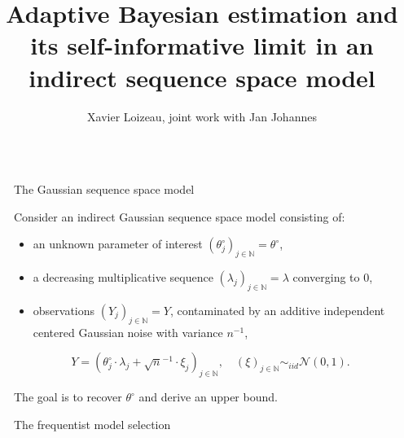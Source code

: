 \documentclass[final,hyperref={pdfpagelabels=false}]{beamer}
\title{\Huge Adaptive Bayesian estimation and its self-informative limit in an indirect sequence space model} %
\author{Xavier Loizeau, joint work with Jan Johannes} %
\institute{Ruprecht-Karls-Universit\"at Heidelberg} %
\begin{document}

\begin{frame}[t] %

\begin{columns}[t] %

\begin{column}{.02\textwidth}\end{column} %

\begin{column}{.30\textwidth} %

\begin{block}{\rule{0pt}{2.5ex} The Gaussian sequence space model}
Consider an indirect Gaussian sequence space model consisting of:
\begin{itemize}
\item an unknown parameter of interest $\left(\theta^{\circ}_{j}\right)_{j \in \mathbb{N}} = \theta^{\circ}$,
\item a decreasing multiplicative sequence $\left(\lambda_{j}\right)_{j \in \mathbb{N}} = \lambda$ converging to $0$,
\item observations $\left(Y_{j}\right)_{j \in \mathbb{N}} = Y$, contaminated by an additive independent centered Gaussian noise with variance $n^{-1}$,
\end{itemize}
\[Y = \left(\theta^{\circ}_{j} \cdot \lambda_{j} + \sqrt{n}^{-1} \cdot \xi_{j}\right)_{j \in \mathbb{N}}, \quad \left(\xi\right)_{j \in \mathbb{N}} \sim_{iid} \mathcal{N}\left(0, 1\right).\]

The goal is to recover $\theta^{\circ}$ and derive an upper bound.
\end{block}

\begin{block}{\rule{0pt}{2.5ex} The frequentist model selection}


\end{block}
\end{column}
\end{columns}
\end{frame}
\end{document}
